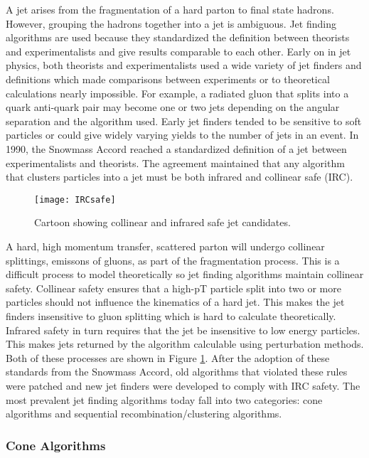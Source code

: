 A jet arises from the fragmentation of a hard parton to final state hadrons.  However, grouping the hadrons together into a jet is ambiguous.  Jet finding algorithms are used because they standardized the definition between theorists and experimentalists and give results comparable to each other. Early on in jet physics, both theorists and experimentalists used a wide variety of jet finders and definitions which made comparisons between experiments or to theoretical calculations nearly impossible\cite{Atkin:2015msa}.  For example, a radiated gluon that splits into a quark anti-quark pair may become one or two jets depending on the angular separation and the algorithm used.  Early jet finders tended to be sensitive to soft particles or could give widely varying yields to the number of jets in an event.  In 1990, the Snowmass Accord\cite{Huth:217490} reached a standardized definition of a jet between experimentalists and theorists.  The agreement maintained that any algorithm that clusters particles into a jet must be both infrared and collinear safe (IRC).  

\begin{figure}[h]
\texttt{[image: IRCsafe]}
\centering
\caption{Cartoon showing collinear and infrared safe jet candidates\cite{Blazey:2000qt}.}
\label{fig:IRCsafe}
\end{figure}

A hard, high momentum transfer, scattered parton will undergo collinear splittings, emissons of gluons, as part of the fragmentation process.  This is a difficult process to model theoretically so jet finding algorithms maintain collinear safety.
Collinear safety ensures that a high-pT particle split into two or more particles should not influence the kinematics of a hard jet.  This makes the jet finders insensitive to gluon splitting which is hard to calculate theoretically.  Infrared safety in turn requires that the jet be insensitive to low energy particles.  This makes jets returned by the algorithm calculable using perturbation methods.  Both of these processes are shown in Figure \ref{fig:IRCsafe}. After the adoption of these standards from the Snowmass Accord, old algorithms that violated these rules were patched and new jet finders were developed to comply with IRC safety.  The most prevalent jet finding algorithms today fall into two categories: cone algorithms and sequential recombination/clustering algorithms.

\subsubsection{Cone Algorithms}

